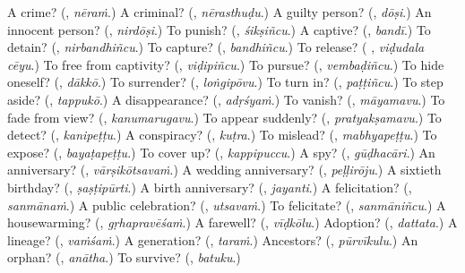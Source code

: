 \begin{tcolorbox}[breakable,colback=teal!4,colframe=teal!35!black,title={Before you move on}]
A crime? (\textbf{}, \emph{nēraṁ}.) A criminal? (\textbf{}, \emph{nērasthuḍu}.) A guilty person? (\textbf{}, \emph{dōṣi}.) An innocent person? (\textbf{}, \emph{nirdōṣi}.) To punish? (\textbf{}, \emph{śikṣiñcu}.) A captive? (\textbf{}, \emph{bandī}.) To detain? (\textbf{}, \emph{nirbandhiñcu}.) To capture? (\textbf{}, \emph{bandhiñcu}.) To release? (\textbf{ }, \emph{viḍudala cēyu}.) To free from captivity? (\textbf{}, \emph{viḍipiñcu}.) To pursue? (\textbf{}, \emph{vembaḍiñcu}.) To hide oneself? (\textbf{}, \emph{dākkō}.) To surrender? (\textbf{}, \emph{loṅgipōvu}.) To turn in? (\textbf{}, \emph{paṭṭiñcu}.) To step aside? (\textbf{}, \emph{tappukō}.) A disappearance? (\textbf{}, \emph{adṛśyaṁ}.) To vanish? (\textbf{}, \emph{māyamavu}.) To fade from view? (\textbf{}, \emph{kanumarugavu}.) To appear suddenly? (\textbf{}, \emph{pratyakṣamavu}.) To detect? (\textbf{}, \emph{kanipeṭṭu}.) A conspiracy? (\textbf{}, \emph{kuṭra}.) To mislead? (\textbf{}, \emph{mabhyapeṭṭu}.) To expose? (\textbf{}, \emph{bayaṭapeṭṭu}.) To cover up? (\textbf{}, \emph{kappipuccu}.) A spy? (\textbf{}, \emph{gūḍhacāri}.) An anniversary? (\textbf{}, \emph{vārṣikōtsavaṁ}.) A wedding anniversary? (\textbf{}, \emph{peḷḷirōju}.) A sixtieth birthday? (\textbf{}, \emph{ṣaṣṭipūrti}.) A birth anniversary? (\textbf{}, \emph{jayanti}.) A felicitation? (\textbf{}, \emph{sanmānaṁ}.) A public celebration? (\textbf{}, \emph{utsavaṁ}.) To felicitate? (\textbf{}, \emph{sanmāniñcu}.) A housewarming? (\textbf{}, \emph{gṛhapravēśaṁ}.) A farewell? (\textbf{}, \emph{vīḍkōlu}.) Adoption? (\textbf{}, \emph{dattata}.) A lineage? (\textbf{}, \emph{vaṁśaṁ}.) A generation? (\textbf{}, \emph{taraṁ}.) Ancestors? (\textbf{}, \emph{pūrvīkulu}.) An orphan? (\textbf{}, \emph{anātha}.) To survive? (\textbf{}, \emph{batuku}.)
\end{tcolorbox}
